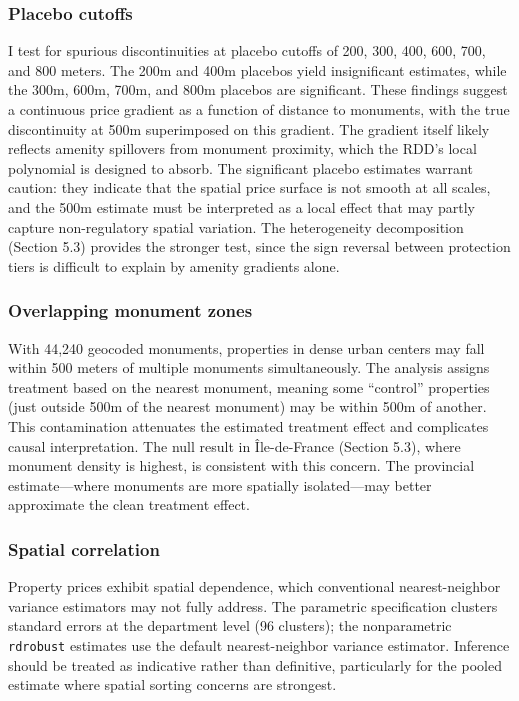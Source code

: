 \documentclass[12pt]{article}
\begin{document}
\subsubsection*{Placebo cutoffs} I test for spurious discontinuities at placebo cutoffs of 200, 300, 400, 600, 700, and 800 meters. The 200m and 400m placebos yield insignificant estimates, while the 300m, 600m, 700m, and 800m placebos are significant. These findings suggest a continuous price gradient as a function of distance to monuments, with the true discontinuity at 500m superimposed on this gradient. The gradient itself likely reflects amenity spillovers from monument proximity, which the RDD's local polynomial is designed to absorb. The significant placebo estimates warrant caution: they indicate that the spatial price surface is not smooth at all scales, and the 500m estimate must be interpreted as a local effect that may partly capture non-regulatory spatial variation. The heterogeneity decomposition (Section 5.3) provides the stronger test, since the sign reversal between protection tiers is difficult to explain by amenity gradients alone.

\subsubsection*{Overlapping monument zones} With 44,240 geocoded monuments, properties in dense urban centers may fall within 500 meters of multiple monuments simultaneously. The analysis assigns treatment based on the nearest monument, meaning some ``control'' properties (just outside 500m of the nearest monument) may be within 500m of another. This contamination attenuates the estimated treatment effect and complicates causal interpretation. The null result in \^{I}le-de-France (Section 5.3), where monument density is highest, is consistent with this concern. The provincial estimate---where monuments are more spatially isolated---may better approximate the clean treatment effect.

\subsubsection*{Spatial correlation} Property prices exhibit spatial dependence, which conventional nearest-neighbor variance estimators may not fully address. The parametric specification clusters standard errors at the department level (96 clusters); the nonparametric \texttt{rdrobust} estimates use the default nearest-neighbor variance estimator. Inference should be treated as indicative rather than definitive, particularly for the pooled estimate where spatial sorting concerns are strongest.
\end{document}
